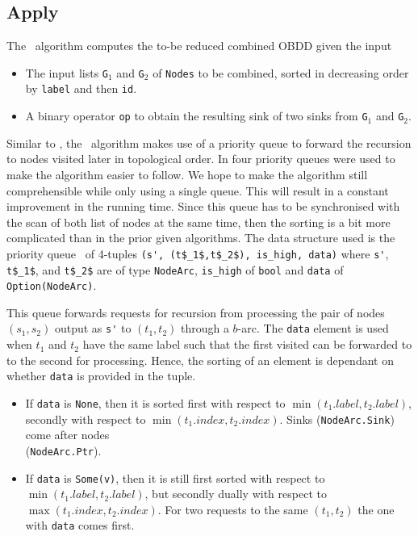 \subsection{Apply} \label{sec:theory__apply}
The \Apply\ algorithm computes the to-be reduced combined OBDD given the input
\begin{itemize}
\item The input lists \lstinline{G}$_1$ and \lstinline{G}$_2$ of
  \lstinline{Nodes} to be combined, sorted in decreasing order by
  \lstinline{label} and then \lstinline{id}.

\item A binary operator \lstinline{op} to obtain the resulting sink of two sinks
  from \lstinline{G}$_1$ and \lstinline{G}$_2$.
\end{itemize}

Similar to \Restrict, the \Apply\ algorithm makes use of a priority queue to
forward the recursion to nodes visited later in topological order. In
\cite{Arge96} four priority queues were used to make the algorithm easier to
follow. We hope to make the algorithm still comprehensible while only using a
single queue. This will result in a constant improvement in the running time.
Since this queue has to be synchronised with the scan of both list of nodes at
the same time, then the sorting is a bit more complicated than in the prior
given algorithms. The data structure used is the priority queue \ApplyQrec\ of
4-tuples \lstinline{(s', (t$_1$,t$_2$), is_high, data)} where \lstinline{s'},
\lstinline{t$_1$}, and \lstinline{t$_2$} are of type \lstinline{NodeArc},
\lstinline{is_high} of \lstinline{bool} and \lstinline{data} of
\lstinline{Option(NodeArc)}.

\newpage
This queue forwards requests for recursion from processing the pair of nodes
$(s_1, s_2)$ output as \lstinline{s'} to $(t_1,t_2)$ through a $b$-arc. The
\lstinline{data} element is used when $t_1$ and $t_2$ have the same label such
that the first visited can be forwarded to to the second for processing. Hence,
the sorting of an element is dependant on whether \lstinline{data} is provided
in the tuple.

\begin{itemize}
\item If \lstinline{data} is \lstinline{None}, then it is sorted first with
  respect to $\min(t_1.\mathit{label},t_2.\mathit{label})$, secondly with respect
  to $\min(t_1.\mathit{index},t_2.\mathit{index})$. Sinks
  (\lstinline{NodeArc.Sink}) come after nodes\\(\lstinline{NodeArc.Ptr}).

\item If \lstinline{data} is \lstinline{Some(v)}, then it is still first
  sorted with respect to $\min(t_1.\mathit{label},t_2.\mathit{label})$, but
  secondly dually with respect to $\max(t_1.\mathit{index}, t_2.\mathit{index})$.
  For two requests to the same $(t_1,t_2)$ the one with \lstinline{data} comes
  first.
\end{itemize}

